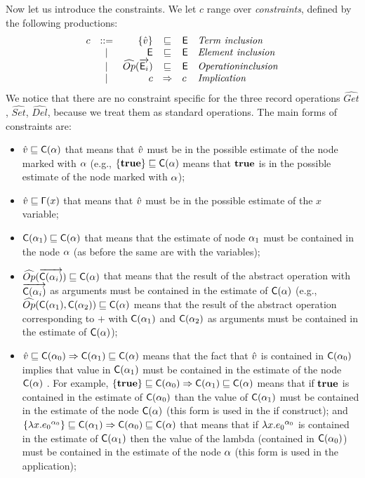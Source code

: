 Now let us introduce the constraints. We let $c$ range over \emph{constraints}, defined by the following productions:
\[
\begin{array}{lcrcll}
c & ::= &\{\vat\} & \sqsubseteq & \El & \mathit{Term\ inclusion}\\
& | & \El & \sqsubseteq & \El & \mathit{Element\ inclusion} \\
& | & \widehat{Op}(\vec{\El_i}) & \sqsubseteq & \El & \mathit{Operation inclusion}\\
& | & c & \Rightarrow & c & \mathit{Implication}\\
\end{array}
\]
We notice that there are no constraint specific for the three record operations $\widehat{Get}$, $\widehat{Set}$, $\widehat{Del}$, because we treat them as standard operations.
The main forms of constraints are:
\begin{itemize}
\item $\hat{v} \sqsubseteq \mathsf{C}(\alpha) $ that means that $\hat{v}$ must be in the possible estimate of the node marked with $\alpha$ (e.g., $\{\mathbf{true}\}\sqsubseteq \mathsf{C}(\alpha)$ means that $\mathbf{true}$ is in the possible estimate of the node marked with $\alpha$);
\item $\hat{v} \sqsubseteq \mathsf{\Gamma}(x) $ that means that $\hat{v}$ must be in the possible estimate of the $x$ variable;
\item $\mathsf{C}(\alpha_1) \sqsubseteq \mathsf{C}(\alpha) $  that means that the estimate of node $\alpha_1$ must be contained in the node $\alpha$ (as before the same are with the variables);
\item $\widehat{Op}(\overrightarrow{\mathsf{C}(\alpha_i)})\sqsubseteq \mathsf{C}(\alpha)$  that means that the result of the abstract operation with $\overrightarrow{\mathsf{C}(\alpha_i)}$ as arguments must be contained in the estimate of $\mathsf{C}(\alpha)$ (e.g., $\widehat{Op}(\mathsf{C}(\alpha_1), \mathsf{C}(\alpha_2))\sqsubseteq \mathsf{C}(\alpha)$ means that the result of the abstract operation corresponding to $+$ with $\mathsf{C}(\alpha_1)$ and $\mathsf{C}(\alpha_2)$ as arguments must be contained in the estimate of $\mathsf{C}(\alpha)$);
\item $\hat{v} \sqsubseteq \mathsf{C}(\alpha_0) \Rightarrow \mathsf{C}(\alpha_1) \sqsubseteq \mathsf{C}(\alpha)$ means that the fact that $\hat{v}$ is contained in $\mathsf{C}(\alpha_0)$ implies that value in $\mathsf{C}(\alpha_1)$ must be contained in the estimate of the node $\mathsf{C}(\alpha)$ . For example, $\{\mathbf{true}\}\sqsubseteq \mathsf{C}(\alpha_0) \Rightarrow \mathsf{C}(\alpha_1) \sqsubseteq \mathsf{C}(\alpha)$ means that if $\mathbf{true}$ is contained in the estimate of $\mathsf{C}(\alpha_0)$ than the value of $\mathsf{C}(\alpha_1)$ must be contained in the estimate of the node $\mathsf{C}(\alpha)$ (this form is used in the if construct); and $\{\lambda x.{e_0}^{\alpha_0}\}\sqsubseteq \mathsf{C}(\alpha_1) \Rightarrow \mathsf{C}(\alpha_0) \sqsubseteq \mathsf{C}(\alpha)$ that means that if $\lambda x.{e_0}^{\alpha_0}$ is contained in the estimate of $\mathsf{C}(\alpha_1)$ then the value of the lambda (contained in $\mathsf{C}(\alpha_0)$) must be contained in the estimate of the node $\alpha$ (this form is used in the application);
\end{itemize}

